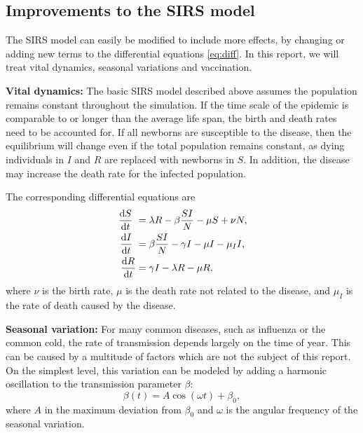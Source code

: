 \documentclass[a4paper,10pt,twocolumn]{article}
\begin{document}
\subsection{Improvements to the SIRS model}

The SIRS model can easily be modified to include more effects, by changing or adding new terms to the differential equations \ref{eq:diff}. 
In this report, we will treat vital dynamics, seasonal variations and vaccination.

\textbf{Vital dynamics:}
The basic SIRS model described above assumes the population remains constant throughout the simulation. If the time scale of the epidemic is comparable to or longer than the average life span, the birth and death rates need to be accounted for. 
If all newborns are susceptible to the disease, then the equilibrium will change even if the total population remains constant, as dying individuals in $I$ and $R$ are replaced with newborns in $S$. 
In addition, the disease may increase the death rate for the infected population. 

The corresponding differential equations are
\begin{subequations}
\begin{align}
\dv{S}{t} &= \lambda R - \beta\frac{SI}{N} - \mu S + \nu N,
\\ \dv{I}{t} &= \beta\frac{SI}{N} - \gamma I - \mu I - \mu_I I,\label{eq:cI}
\\ \dv{R}{t} &= \gamma I - \lambda R - \mu R,
\end{align}
\end{subequations}
where $\nu$ is the birth rate, $\mu$ is the death rate not related to the disease, and $\mu_I$ is the rate of death caused by the disease. 


\textbf{Seasonal variation:} For many common diseases, such as influenza or the common cold, the rate of transmission depends largely on the time of year. This can be caused by a multitude of factors which are not the subject of this report. 
On the simplest level, this variation can be modeled by adding a harmonic oscillation to the transmission parameter $\beta$:
\begin{equation}\label{eq:seasvar}
\beta(t) = A\cos(\omega t) + \beta_0,
\end{equation} 
where $A$ in the maximum deviation from $\beta_0$ and $\omega$ is the angular frequency of the seasonal variation.
\end{document}
